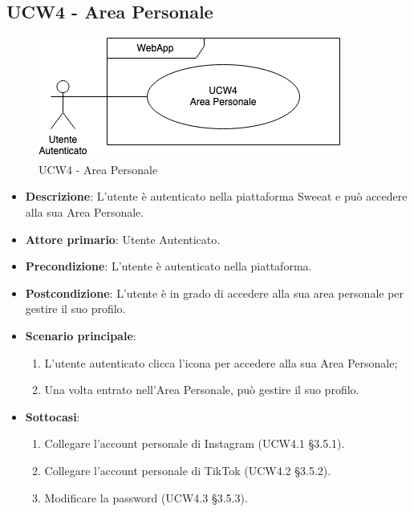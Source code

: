 \subsection{UCW4 - Area Personale}
\begin{figure}[!h]
\centering
\includegraphics[scale=0.5]{UC_images/UCW4.png}
\caption{UCW4 - Area Personale}
\end{figure}
\begin{itemize}
\item \textbf{Descrizione}: L'utente è autenticato nella piattaforma Sweeat e può accedere alla sua Area Personale.
\item \textbf{Attore primario}: Utente Autenticato.
\item \textbf{Precondizione}: L'utente è autenticato nella piattaforma.
\item \textbf{Postcondizione}: L'utente è in grado di accedere alla sua area personale per gestire il suo profilo.

\item \textbf{Scenario principale}:
\begin{enumerate}
\item L'utente autenticato clicca l'icona per accedere alla sua Area Personale;
\item Una volta entrato nell'Area Personale, può gestire il suo profilo.
\end{enumerate}

\item \textbf{Sottocasi}:
\begin{enumerate}
	\item Collegare l'account personale di Instagram (UCW4.1 \S 3.5.1).
	\item Collegare l'account personale di TikTok (UCW4.2 \S 3.5.2).
	\item Modificare la password (UCW4.3 \S 3.5.3). 
\end{enumerate}
\end{itemize}

